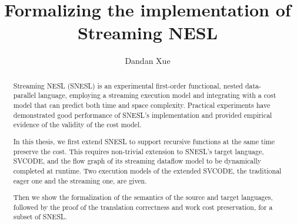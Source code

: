 \documentclass[a4paper]{report}
\title{Formalizing the implementation of Streaming NESL}
\author{Dandan Xue}
\numberwithin{equation}{chapter}
\numberwithin{figure}{chapter}
\begin{document}
\large



\begin{abstract}
 Streaming NESL (SNESL) is an experimental first-order functional, nested data-parallel language, employing a streaming execution model and integrating with a cost model that can predict both time and space complexity.
 Practical experiments have demonstrated good performance of SNESL's implementation and provided empirical evidence of the validity of the cost model.
 
 In this thesis, we first extend SNESL to support recursive functions at the same time preserve the cost.
 This requires non-trivial extension to SNESL's target language, SVCODE, and the flow graph of its streaming dataflow model to be dynamically completed at runtime.
 Two execution models of the extended SVCODE, the traditional eager one and the streaming one, are given.
 
 Then we show the formalization of the semantics of the source and target languages, followed by the proof of the translation correctness and work cost preservation, for a subset of SNESL.
 
\end{abstract}


\tableofcontents











\end{document}
